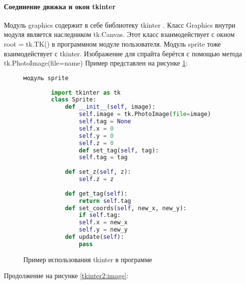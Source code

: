 \paragraph{Соединение движка и окон tkinter}
Модуль graphics содержит в себе библиотеку tkinter . Класс Graphics внутри модуля является наследником tk.Canvas. Этот класс взаимодействует с окном root = tk.TK() в программном модуле пользователя. Модуль sprite тоже взаимодействует с tkinter. Изображение для спрайта берётся с помощью метода tk.PhotoImage(file=name)
Пример представлен на рисунке \ref{tk:image}:
\begin{figure}[H]
	\begin{lstlisting}[language=Python]
		модуль sprite
		
		import tkinter as tk
		class Sprite:
			def __init__(self, image):
				self.image = tk.PhotoImage(file=image)
				self.tag = None
				self.x = 0
				self.y = 0
				self.z = 0		
				def set_tag(self, tag):
				self.tag = tag
			
			def set_z(self, z):
				self.z = z
			
			def get_tag(self):
				return self.tag	
			def set_coords(self, new_x, new_y):
				if self.tag:
				self.x = new_x
				self.y = new_y
			def update(self):
				pass
	\end{lstlisting}  
	\caption{Пример использования tkinter в программе}
	\label{tk:image}
\end{figure}
Продолжение на рисунке \ref{tkinter2:image}:
